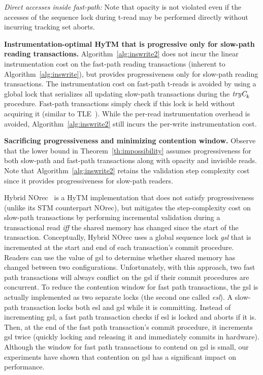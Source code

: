 \vspace{1mm}\noindent\textit{Direct accesses inside fast-path:}
Note that opacity is not violated even if the accesses of the sequence lock during t-read may be performed directly without incurring tracking set aborts.

\vspace{1mm}\noindent\textbf{Instrumentation-optimal HyTM that is progressive only for slow-path reading transactions.}
Algorithm~\ref{alg:inswrite2} does not incur the linear instrumentation cost
on the fast-path reading transactions (inherent to Algorithm~\ref{alg:inswrite}), but provides progressiveness only
for slow-path reading transactions. 
The instrumentation cost on fast-path t-reads is avoided by using a global lock that serializes all updating slow-path transactions
during the $\textit{tryC}_k$ procedure. Fast-path transactions simply check if this lock is held without acquiring it (similar to TLE~\cite{tle}). While the per-read instrumentation overhead
is avoided, Algorithm~\ref{alg:inswrite2} still incurs the per-write instrumentation cost.

\vspace{1mm}\noindent\textbf{Sacrificing progressiveness and minimizing contention window.}
Observe that the lower bound in Theorem~\ref{th:impossibility} assumes progressiveness for both slow-path and fast-path transactions
along with opacity and invisible reads. Note that Algorithm~\ref{alg:inswrite2} retains the validation step complexity cost since it provides progressiveness for slow-path readers.

Hybrid NOrec~\cite{hybridnorec} is a HyTM implementation that does not satisfy progressiveness
(unlike its STM counterpart NOrec), but mitigates
the step-complexity cost on slow-path transactions by performing incremental validation 
during a transactional read \emph{iff} 
the shared memory has changed since the start of the transaction.
Conceptually, Hybrid NOrec uses a global sequence lock \emph{gsl} that is incremented 
at the start and end of each transaction's commit procedure.
Readers can use the value of gsl to determine whether shared memory has changed between two configurations.
Unfortunately, with this approach, two fast path transactions will always conflict on the gsl if their 
commit procedures are concurrent.
To reduce the contention window for fast path transactions, the gsl is actually implemented as two separate locks (the second one called \emph{esl}).
A slow-path transaction locks both esl and gsl while it is committing.
Instead of incrementing gsl, a fast path transaction checks if esl is locked and aborts if it is.
Then, at the end of the fast path transaction's commit procedure, 
it increments gsl twice (quickly locking and releasing it and immediately commits in hardware).
Although the window for fast path transactions to contend on gsl is small, our experiments have shown that contention on gsl has a significant impact on performance.

%


